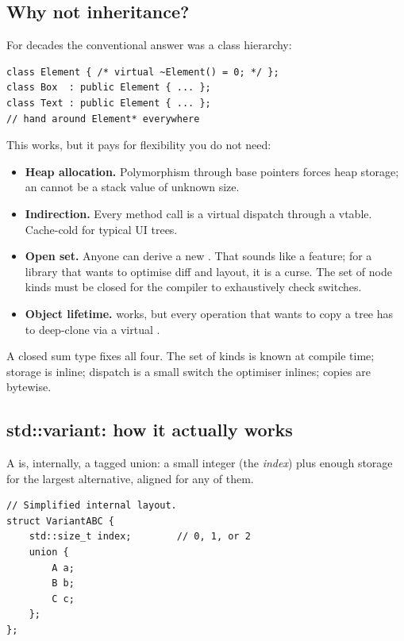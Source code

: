 \subsection*{Why not inheritance?}

For decades the conventional answer was a class hierarchy:

\begin{lstlisting}
class Element { /* virtual ~Element() = 0; */ };
class Box  : public Element { ... };
class Text : public Element { ... };
// hand around Element* everywhere
\end{lstlisting}

This works, but it pays for flexibility you do not need:

\begin{itemize}[leftmargin=*]
  \item \textbf{Heap allocation.} Polymorphism through base
    pointers forces heap storage; an  cannot be a
    stack value of unknown size.
  \item \textbf{Indirection.} Every method call is a virtual
    dispatch through a vtable. Cache-cold for typical UI trees.
  \item \textbf{Open set.} Anyone can derive a new
    . That sounds like a feature; for a library
    that wants to optimise diff and layout, it is a curse. The
    set of node kinds must be closed for the compiler to
    exhaustively check switches.
  \item \textbf{Object lifetime.} 
    works, but every operation that wants to copy a tree has to
    deep-clone via a virtual .
\end{itemize}

A closed sum type fixes all four. The set of kinds is known at
compile time; storage is inline; dispatch is a small switch the
optimiser inlines; copies are bytewise.

\subsection*{std::variant: how it actually works}

A  is, internally, a tagged union: a
small integer (the \emph{index}) plus enough storage for the
largest alternative, aligned for any of them.

\begin{lstlisting}
// Simplified internal layout.
struct VariantABC {
    std::size_t index;        // 0, 1, or 2
    union {
        A a;
        B b;
        C c;
    };
};
\end{lstlisting}

